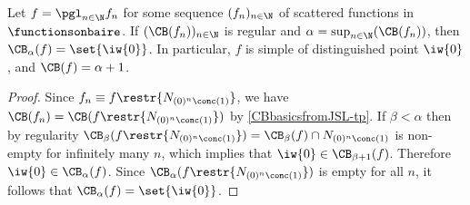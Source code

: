 \begin{proposition}\label{CBrankofPgluingofregularsequence1}
Let $f=\pgl_{n\in\N} f_n$ for some sequence $(f_n)_{n\in\N}$ of scattered functions in $\functionsonbaire$. 
If $(\CB(f_n))_{n\in\N}$ is regular and $\alpha=\sup_{n\in\N}(\CB(f_n))$, then $\CB_\alpha(f)=\set{\iw{0}}$.
In particular, $f$ is simple of distinguished point $\iw{0}$, and $\CB(f)=\alpha+1$.
\end{proposition}
\begin{proof}
Since $f_n\equiv f\restr{N_{(0)^n\conc(1)}}$, we have $\CB(f_n)=\CB(f\restr{N_{(0)^n\conc(1)}})$ by \cref{CBbasicsfromJSL-tp}.
If $\beta<\alpha$ then by regularity $\CB_\beta(f\restr{N_{(0)^n\conc(1)}})=\CB_\beta(f)\cap N_{(0)^n\conc(1)}$ is non-empty for infinitely many $n$,
which implies that $\iw{0}\in\CB_{\beta+1}(f)$. Therefore $\iw{0}\in\CB_{\alpha}(f)$.
Since $\CB_{\alpha}(f\restr{N_{(0)^n\conc(1)}})$ is empty for all $n$, it follows that $\CB_{\alpha}(f)=\set{\iw{0}}$.
\end{proof}

